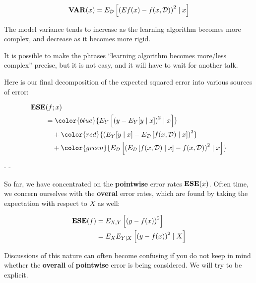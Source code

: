 %
%
\begin{frame}
  \begin{align*}
    \operatorname*{\mathbf{VAR}}(x) = E_{\operatorname*{\mathcal{D}}} \left[ \left( Ef(x) - f(x,\operatorname*{\mathcal{D}}) \right)^2 \mid x \right]
  \end{align*}

  The model variance tends to increase as the learning algorithm becomes more
  complex, and decrease as it becomes more rigid.
\end{frame}
%
%
\begin{frame}
  It is possible to make the phrases ``learning algorithm becomes more/less complex''
  precise, but it is not easy, and it will have to wait for another talk.
\end{frame}
%
%
\begin{frame}
  Here is our final decomposition of the expected squared error into various
  sources of error:

  \begin{align*}
    \ESE & (f; x) \\
    &= \color{blue}{ 
         E_Y \left[ \left( y - E_Y[y \mid x] \right)^2 \mid x \right] } \\
       & \quad + \color{red}{
         \left( E_Y[y \mid x] -  E_{\D} \left[ f(x, \D) \mid x \right] \right)^2
       } \\
       & \quad + \color{green}{
         E_{\D} \left[ \left( E_{\D} \left[ f(x, \D) \mid x \right] - 
         f(x,\D) \right)^2 \mid x \right]
       }
  \end{align*}
  \begin{center}
    \color{blue}{Irreducible Error} - \color{red}{Model Bias} - \color{green}{Model
    Variance}
  \end{center}
\end{frame}
%
%
\begin{frame}
  So far, we have concentrated on the \textbf{pointwise} error rates $\operatorname*{\mathbf{ESE}}(x)$.
  Often time, we concern ourselves with the \textbf{overal} error rates, which
  are found by taking the expectation with respect to $X$ as well:

  \begin{align*}
    \operatorname*{\mathbf{ESE}}(f) & = E_{X,Y} \left[ \left( y - f(x) \right)^2 \right] \\
    &= E_X E_{Y \mid X} \left[ \left( y - f(x) \right)^2 \mid X \right]
  \end{align*}

  Discussions of this nature can often become confusing if you do not keep in
  mind whether the \textbf{overall} of \textbf{pointwise} error is being
  considered.  We will try to be explicit.
\end{frame}
